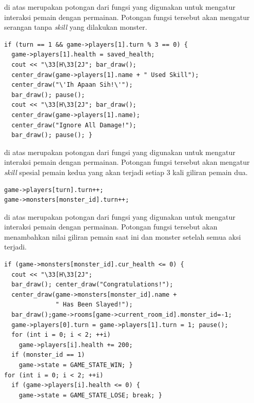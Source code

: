 \documentclass[../main.tex]{subfiles}
\begin{document}
{\Script} di atas merupakan potongan dari fungsi  yang digunakan untuk mengatur interaksi pemain dengan permainan. Potongan fungsi tersebut akan mengatur serangan tanpa \textit{skill} yang dilakukan monster.

\begin{code}
\begin{verbatim}
if (turn == 1 && game->players[1].turn % 3 == 0) {
  game->players[1].health = saved_health;
  cout << "\33[H\33[2J"; bar_draw();
  center_draw(game->players[1].name + " Used Skill");
  center_draw("\'Ih Apaan Sih!\'");
  bar_draw(); pause();
  cout << "\33[H\33[2J"; bar_draw();
  center_draw(game->players[1].name);
  center_draw("Ignore All Damage!");
  bar_draw(); pause(); }
\end{verbatim}
\end{code}

{\Script} di atas merupakan potongan dari fungsi  yang digunakan untuk mengatur interaksi pemain dengan permainan. Potongan fungsi tersebut akan mengatur \textit{skill} spesial pemain kedua yang akan terjadi setiap 3 kali giliran pemain dua.

\begin{code}
\begin{verbatim}
game->players[turn].turn++;
game->monsters[monster_id].turn++;
\end{verbatim}
\end{code}

{\Script} di atas merupakan potongan dari fungsi  yang digunakan untuk mengatur interaksi pemain dengan permainan. Potongan fungsi tersebut akan menambahkan nilai giliran pemain saat ini dan monster setelah semua aksi terjadi.

\begin{code}
\begin{verbatim}
if (game->monsters[monster_id].cur_health <= 0) {
  cout << "\33[H\33[2J";
  bar_draw(); center_draw("Congratulations!");
  center_draw(game->monsters[monster_id].name +
              " Has Been Slayed!");
  bar_draw();game->rooms[game->current_room_id].monster_id=-1;
  game->players[0].turn = game->players[1].turn = 1; pause();
  for (int i = 0; i < 2; ++i)
    game->players[i].health += 200;
  if (monster_id == 1)
    game->state = GAME_STATE_WIN; }
for (int i = 0; i < 2; ++i) 
  if (game->players[i].health <= 0) {
    game->state = GAME_STATE_LOSE; break; }
\end{verbatim}
\end{code}
\end{document}

